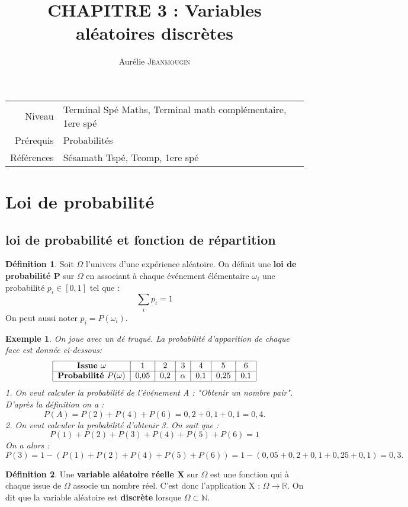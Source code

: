 \documentclass[a4paper,12pt,final]{article}
\title{CHAPITRE 3 : Variables aléatoires discrètes}
\author{Aurélie \textsc{Jeanmougin}}
\newtheorem{Ex}{Exemple}[section]
\theoremstyle{theorem}
\theoremstyle{definition}
\theoremstyle{definition}
\theoremstyle{definition}
\newtheorem{Def}{Définition}[section]
\begin{document}
	
	\maketitle
	
\begin{tabular}{r | l}
	Niveau & Terminal Spé Maths, Terminal math complémentaire, 1ere spé \\
	Prérequis & Probabilités \\
	Références & Sésamath Tspé, Tcomp, 1ere spé
\end{tabular}

\section{Loi de probabilité}
	\subsection{loi de probabilité et fonction de répartition}

	\begin{Def}
		Soit $\Omega$ l'univers d'une expérience aléatoire. On définit une \textbf{loi de probabilité P} sur $\Omega$ en associant à chaque événement élémentaire $\omega_{i}$ une probabilité $p_{i} \in [0,1]$ tel que :
		\[\sum_{i}p_{i} = 1\]
		On peut aussi noter $p_{i} = P(\omega_{i})$.
	\end{Def}

	\begin{Ex}
		On joue avec un dé truqué. La probabilité d'apparition de chaque face est donnée ci-dessous: \[
		\begin{tabular}{|c|c|c|c|c|c|c|}
		\hline \textbf{Issue $\omega$} & 1 & 2 & 3 & 4 & 5 & 6 \\
		\hline \textbf{Probabilité $P(\omega)$} & 0,05 & 0,2 & $\alpha$ & 0,1 & 0,25 & 0,1 \\
		\hline
		\end{tabular} \]
		1. On veut calculer la probabilité de l'événement A : "Obtenir un nombre pair". D'après la définition on a :
		\[P(A) = P(2)+P(4)+P(6) = 0,2+0,1+0,1 = 0,4.\]
		2. On veut calculer la probabilité d'obtenir 3. On sait que :
		\[P(1)+P(2)+P(3)+P(4)+P(5)+P(6) = 1\]
		On a alors : 
		\[P(3) = 1 - (P(1)+P(2)+P(4)+P(5)+P(6)) = 1-(0,05+0,2+0,1+0,25+0,1) = 0,3.\]
	\end{Ex}

	\begin{Def}
		Une \textbf{variable aléatoire réelle X} sur $\Omega$ est une fonction qui à chaque issue de $\Omega$ associe un nombre réel. C'est donc l'application X : $\Omega \rightarrow \mathbb{R}$. On dit que la variable aléatoire est \textbf{discrète} lorsque $\Omega \subset \mathbb{N}$.
	\end{Def}
\end{document}

